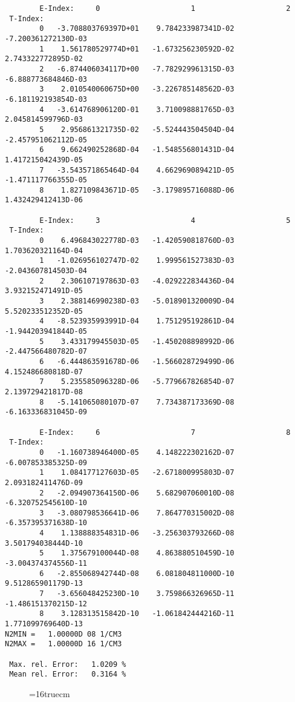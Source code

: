 \documentclass[12pt,dvipdfmx]{article}
\begin{document}
\begin{small}\begin{verbatim}
        E-Index:     0                     1                     2
 T-Index:
        0   -3.708803769397D+01    9.784233987341D-02   -7.200361272130D-03
        1    1.561780529774D+01   -1.673256230592D-02    2.743322772895D-02
        2   -6.874406034117D+00   -7.782929961315D-03   -6.888773684846D-03
        3    2.010540060675D+00   -3.226785148562D-03   -6.181192193854D-03
        4   -3.614768906120D-01    3.710098881765D-03    2.045814599796D-03
        5    2.956861321735D-02   -5.524443504504D-04   -2.457951062112D-05
        6    9.662490252868D-04   -1.548556801431D-04    1.417215042439D-05
        7   -3.543571865464D-04    4.662969089421D-05   -1.471117766355D-05
        8    1.827109843671D-05   -3.179895716088D-06    1.432429412413D-06

        E-Index:     3                     4                     5
 T-Index:
        0    6.496843022778D-03   -1.420590818760D-03    1.703620321164D-04
        1   -1.026956102747D-02    1.999561527383D-03   -2.043607814503D-04
        2    2.306107197863D-03   -4.029222834436D-04    3.932152471491D-05
        3    2.388146990238D-03   -5.018901320009D-04    5.520233512352D-05
        4   -8.523935993991D-04    1.751295192861D-04   -1.944203941844D-05
        5    3.433179945503D-05   -1.450208898992D-06   -2.447566480782D-07
        6   -6.444863591678D-06   -1.566028729499D-06    4.152486680818D-07
        7    5.235585096328D-06   -5.779667826854D-07    2.139729421817D-08
        8   -5.141065080107D-07    7.734387173369D-08   -6.163336831045D-09

        E-Index:     6                     7                     8
 T-Index:
        0   -1.160738946400D-05    4.148222302162D-07   -6.007853385325D-09
        1    1.084177127603D-05   -2.671800995803D-07    2.093182411476D-09
        2   -2.094907364150D-06    5.682907060010D-08   -6.320752545610D-10
        3   -3.080798536641D-06    7.864770315002D-08   -6.357395371638D-10
        4    1.138888354831D-06   -3.256303793266D-08    3.501794038444D-10
        5    1.375679100044D-08    4.863880510459D-10   -3.004374374556D-11
        6   -2.855068942744D-08    6.081804811000D-10    9.512865901179D-13
        7   -3.656048425230D-10    3.759866326965D-11   -1.486151370215D-12
        8    3.128313515842D-10   -1.061842444216D-11    1.771099769640D-13
N2MIN =   1.00000D 08 1/CM3
N2MAX =   1.00000D 16 1/CM3

 Max. rel. Error:   1.0209 %
 Mean rel. Error:   0.3164 %

\end{verbatim}\end{small}
\begin{figure} \label{2.2.11}
\epsfxsize=16truecm
\end{figure}
\newpage
\end{document}
